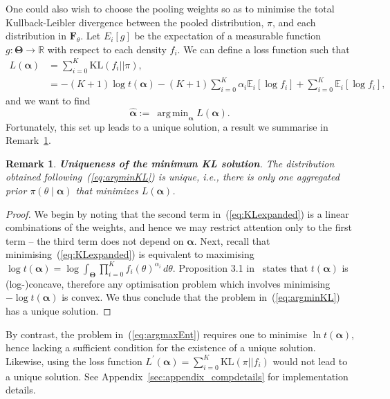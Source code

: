 \documentclass[a4paper, notitlepage, 11pt]{article}
\DeclareMathOperator*{\argmin}{arg\,min}
\newtheorem{remark}{Remark}[]
\begin{document}
One could also wish to choose the pooling weights so as to minimise the total Kullback-Leibler divergence between the pooled distribution, $\pi$, and each distribution in $\mathbf{F}_{\theta}$.
Let $E_i[g]$ be the expectation of a measurable function $g: \boldsymbol{\Theta} \to \mathbb{R}$ with respect to each density $f_i$.
We can define a loss function such that
\begin{align}
\nonumber
L(\boldsymbol\alpha) &= \sum_{i=0}^K  \text{KL}(f_i || \pi ), \\
\label{eq:KLexpanded}
     &= - (K+1)\log t(\boldsymbol\alpha) - (K+1) \sum_{i=0}^K\alpha_i \mathbb{E}_i [\log f_i ]  + \sum_{i=0}^K \mathbb{E}_i\left[\log f_i\right], 
\end{align}
and we want to find 
\begin{equation}
\label{eq:argminKL}
    \hat{\boldsymbol\alpha}:= \:\argmin_{\boldsymbol\alpha} L(\boldsymbol\alpha).   
\end{equation}
Fortunately, this set up leads to a unique solution, a result we summarise in Remark~\ref{rmk:uniqueness}.
\begin{remark}
\label{rmk:uniqueness}
\textbf{Uniqueness of the minimum KL solution}.
 The distribution obtained following~(\ref{eq:argminKL}) is unique, i.e., there is only one aggregated prior $\pi(\theta \mid \boldsymbol\alpha)$ that minimizes $L(\boldsymbol\alpha)$.
\end{remark}
\begin{proof}
We begin by noting that the second term in~(\ref{eq:KLexpanded}) is a linear combinations of the weights, and hence we may restrict attention only to the first term -- the third term does not depend on $\boldsymbol{\alpha}$.
Next, recall that minimising~(\ref{eq:KLexpanded}) is equivalent to maximising $\log t(\boldsymbol\alpha) = \log\int_{\boldsymbol\Theta}\prod_{i=0}^{K}f_i(\theta)^{\alpha_i}\, d\theta$.
Proposition 3.1 in~\cite{Rufo2012A} states that $t(\boldsymbol\alpha)$ is (log-)concave, therefore any optimisation problem which involves minimising $-\log t(\boldsymbol{\alpha})$ is convex.
We thus conclude that the problem in~(\ref{eq:argminKL}) has a unique solution.
\end{proof}
By contrast, the problem in~(\ref{eq:argmaxEnt}) requires one to minimise $\ln t(\boldsymbol\alpha)$, hence lacking a sufficient condition for the existence of a unique solution.
Likewise, using  the loss function $L^\prime(\boldsymbol\alpha) = \sum_{i=0}^K  \text{KL}(\pi ||f_i )$ would not lead to a unique solution.
See Appendix~\ref{sec:appendix_compdetails} for implementation details.
\end{document}
